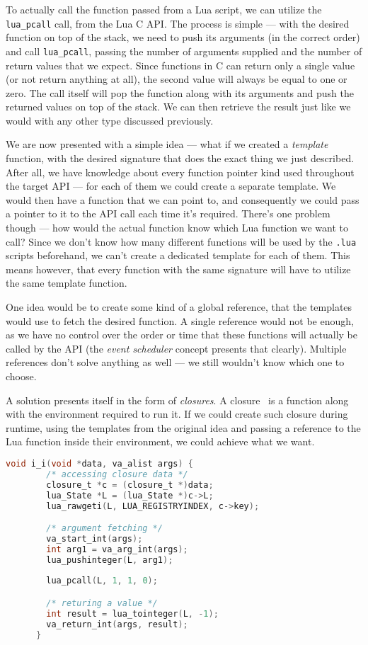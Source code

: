 \documentclass[polish, english]{iithesis}
\begin{document}
    To actually call the function passed from a Lua script, we can utilize the \texttt{lua\_pcall} call, from the Lua C API.
    The process is simple --- with the desired function on top of the stack, we need to push its arguments (in the correct order) and call \texttt{lua\_pcall}, passing the number of arguments supplied and the number of return values that we expect.
    Since functions in C can return only a single value (or not return anything at all), the second value will always be equal to one or zero.
    The call itself will pop the function along with its arguments and push the returned values on top of the stack.
    We can then retrieve the result just like we would with any other type discussed previously.

    We are now presented with a simple idea --- what if we created a \textit{template} function, with the desired signature that does the exact thing we just described.
    After all, we have knowledge about every function pointer kind used throughout the target API --- for each of them we could create a separate template.
    We would then have a function that we can point to, and consequently we could pass a pointer to it to the API call each time it's required.
    There's one problem though --- how would the actual function know which Lua function we want to call?
    Since we don't know how many different functions will be used by the \texttt{.lua} scripts beforehand, we can't create a dedicated template for each of them.
    This means however, that every function with the same signature will have to utilize the same template function.

    One idea would be to create some kind of a global reference, that the templates would use to fetch the desired function.
    A single reference would not be enough, as we have no control over the order or time that these functions will actually be called by the API (the \textit{event scheduler} concept presents that clearly).
    Multiple references don't solve anything as well --- we still wouldn't know which one to choose.

    A solution presents itself in the form of \textit{closures}.
    A closure~\cite{closure} is a function along with the environment required to run it.
    If we could create such closure during runtime, using the templates from the original idea and passing a reference to the Lua function inside their environment, we could achieve what we want.
    \begin{lstlisting}[language=c, caption=Example of a generated template function for an \texttt{int (*)(int)} callback]
      void i_i(void *data, va_alist args) {
        /* accessing closure data */
        closure_t *c = (closure_t *)data;
        lua_State *L = (lua_State *)c->L;
        lua_rawgeti(L, LUA_REGISTRYINDEX, c->key);

        /* argument fetching */
        va_start_int(args);
        int arg1 = va_arg_int(args);
        lua_pushinteger(L, arg1);
        
        lua_pcall(L, 1, 1, 0);

        /* returing a value */
        int result = lua_tointeger(L, -1);
        va_return_int(args, result);
      }
    \end{lstlisting}
\end{document}
